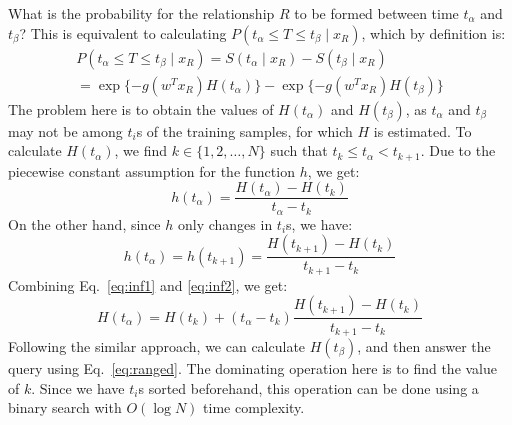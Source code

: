  What is the probability for the relationship $R$ to be formed between time $t_\alpha$ and $t_\beta$? This is equivalent to calculating $P(t_\alpha \le T \le t_\beta \mid x_R)$, which by definition is:
\begin{equation}\label{eq:ranged}
\begin{split}
P(t_\alpha\le T \le t_\beta \mid x_R) = S(t_\alpha\mid x_R) - S(t_\beta\mid x_R)\\
= \exp\{-g({w}^Tx_R){H}(t_\alpha)\} - \exp\{-g({w}^Tx_R){H}(t_\beta)\}
\end{split}
\end{equation}
The problem here is to obtain the values of ${H}(t_\alpha)$ and ${H}(t_\beta)$, as $t_\alpha$ and $t_\beta$ may not be among $t_i$s of the training samples, for which ${H}$ is estimated. To calculate ${H}(t_\alpha)$, we find $k\in\{1,2,\dots,N\}$ such that $t_k\le t_\alpha < t_{k+1}$.
Due to the piecewise constant assumption for the function $h$, we get:
\begin{equation}\label{eq:inf1}
{h}(t_\alpha)=\frac{{H}(t_\alpha)-{H}(t_k)}{t_\alpha-t_k}
\end{equation} 
On the other hand, since $h$ only changes in $t_i$s, we have:
\begin{equation}\label{eq:inf2}
{h}(t_\alpha)={h}(t_{k+1})=\frac{{H}(t_{k+1})-{H}(t_k)}{t_{k+1}-t_k}
\end{equation}
Combining Eq.~\ref{eq:inf1} and \ref{eq:inf2}, we get:
\begin{equation}\label{eq:inf3}
{H}(t_\alpha)={H}(t_k)+(t_\alpha-t_k)\frac{{H}(t_{k+1})-{H}(t_k)}{t_{k+1}-t_k}
\end{equation}
Following the similar approach, we can calculate ${H}(t_\beta)$, and then answer the query using Eq.~\ref{eq:ranged}. The dominating operation here is to find the value of $k$. Since we have $t_i$s sorted beforehand, this operation can be done using a binary search with $O(\log N)$ time complexity.\\

